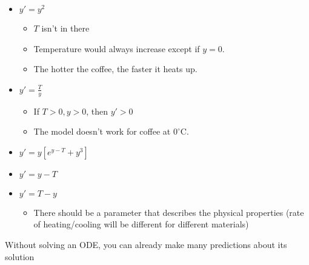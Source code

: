 \begin{itemize}
\begin{example}
              \begin{itemize}
                  \item $y'=y^2$
                        \begin{itemize}
                            \item $T$ isn't in there
                            \item Temperature would always increase except if $y=0$.
                            \item The hotter the coffee, the faster it heats up.
                        \end{itemize}
                  \item $y'=\frac{T}{y}$
                        \begin{itemize}
                            \item If $T>0, y>0$, then $y'>0$
                            \item The model doesn't work for coffee at $0^\circ \text{C}$.
                        \end{itemize}
                  \item $y'=y[e^{y-T}+y^3]$
                  \item $y'=y-T$
                  \item $y'=T-y$
                        \begin{itemize}
                            \item There should be a parameter that describes the physical properties (rate of heating/cooling will be different for different materials)
                        \end{itemize}
              \end{itemize}
          \end{example}
          \begin{idea}
              Without solving an ODE, you can already make many predictions about its solution
              \vspace{2mm}


\end{idea}
\end{itemize}
